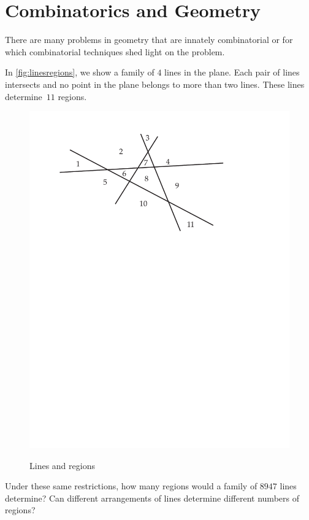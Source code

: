 \section{Combinatorics and Geometry}\label{s:intro:geom}

There are many problems in geometry that are innately combinatorial or
for which combinatorial techniques shed light on the problem.

\begin{example}  
  In \autoref{fig:linesregions}, we show a family of $4$ lines in
  the plane.  Each pair of lines intersects and no point in the plane
  belongs to more than two lines.  These lines determine~$11$ regions.

\begin{figure}[hbt]
\begin{center}
\includegraphics[viewport=60 480 470 745, scale=.6]{intro-figs/3012-fig9}\\
\end{center}
\caption{Lines and regions}
\label{fig:linesregions}
\end{figure}

Under these same restrictions, how many regions would a family of
$8947$ lines determine?  Can different arrangements of lines determine
different numbers of regions?
\end{example}

